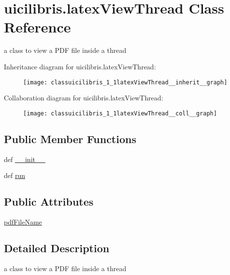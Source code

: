 \hypertarget{classuicilibris_1_1latexViewThread}{\section{uicilibris.\-latex\-View\-Thread \-Class \-Reference}
\label{classuicilibris_1_1latexViewThread}
}


a class to view a \-P\-D\-F file inside a thread  




\-Inheritance diagram for uicilibris.\-latex\-View\-Thread\-:
\nopagebreak
\begin{figure}[H]
\begin{center}
\leavevmode
\texttt{[image: classuicilibris\_1\_1latexViewThread\_\_inherit\_\_graph]}
\end{center}
\end{figure}


\-Collaboration diagram for uicilibris.\-latex\-View\-Thread\-:
\nopagebreak
\begin{figure}[H]
\begin{center}
\leavevmode
\texttt{[image: classuicilibris\_1\_1latexViewThread\_\_coll\_\_graph]}
\end{center}
\end{figure}
\subsection*{\-Public \-Member \-Functions}
\begin{DoxyCompactItemize}
\item 
def \hyperlink{classuicilibris_1_1latexViewThread_af503531fb89e56a5727c2241c91763e7}{\-\_\-\-\_\-init\-\_\-\-\_\-}
\item 
def \hyperlink{classuicilibris_1_1latexViewThread_a1ce993aec287c3df73fd061a2b64732b}{run}
\end{DoxyCompactItemize}
\subsection*{\-Public \-Attributes}
\begin{DoxyCompactItemize}
\item 
\hyperlink{classuicilibris_1_1latexViewThread_a2280202512f395afb09e42f820d27fad}{pdf\-File\-Name}
\end{DoxyCompactItemize}


\subsection{\-Detailed \-Description}
a class to view a \-P\-D\-F file inside a thread 

